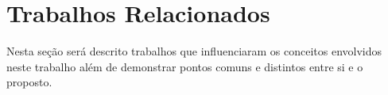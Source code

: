 \chapter{Trabalhos Relacionados}\label{trabalhorel}
Nesta seção será descrito trabalhos que influenciaram os conceitos envolvidos neste trabalho além de demonstrar pontos comuns e distintos entre si e o proposto.